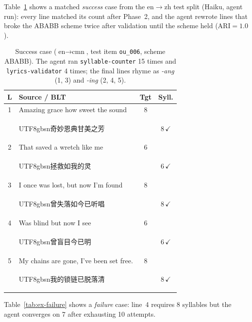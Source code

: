 \documentclass[11pt]{article}
\begin{document}
Table~\ref{tab:ex-success} shows a matched \emph{success} case from the en$\rightarrow$zh test split (Haiku, agent run): every line matched its count after Phase~2, and the agent rewrote lines that broke the ABABB scheme twice after validation until the scheme held ($\text{ARI}{=}1.0$).

\begin{table}[h]
\centering
\footnotesize
\setlength{\tabcolsep}{3pt}
\begin{tabular}{@{}clcc@{}}
\toprule
\textbf{L} & \textbf{Source / BLT} & \textbf{Tgt} & \textbf{Syll.} \\
\midrule
1 & Amazing grace how sweet the sound & 8 & \\
  & \begin{CJK}{UTF8}{gbsn}奇妙恩典甘美之芳\end{CJK} & & 8\,$\checkmark$ \\
2 & That saved a wretch like me & 6 & \\
  & \begin{CJK}{UTF8}{gbsn}拯救如我的灵\end{CJK} & & 6\,$\checkmark$ \\
3 & I once was lost, but now I'm found & 8 & \\
  & \begin{CJK}{UTF8}{gbsn}曾失落如今已听唱\end{CJK} & & 8\,$\checkmark$ \\
4 & Was blind but now I see & 6 & \\
  & \begin{CJK}{UTF8}{gbsn}曾盲目今已明\end{CJK} & & 6\,$\checkmark$ \\
5 & My chains are gone, I've been set free. & 8 & \\
  & \begin{CJK}{UTF8}{gbsn}我的锁链已脱落清\end{CJK} & & 8\,$\checkmark$ \\
\bottomrule
\end{tabular}
\caption{Success case ($\text{en} \rightarrow \text{cmn}$, test item \texttt{ou\_006}, scheme ABABB). The agent ran \texttt{syllable-counter} 15 times and \texttt{lyrics-validator} 4 times; the final lines rhyme as \emph{-ang} (1, 3) and \emph{-ing} (2, 4, 5).}
\label{tab:ex-success}
\end{table}

Table~\ref{tab:ex-failure} shows a \emph{failure} case: line~4 requires 8 syllables but the agent converges on 7 after exhausting 10 attempts.
\end{document}
